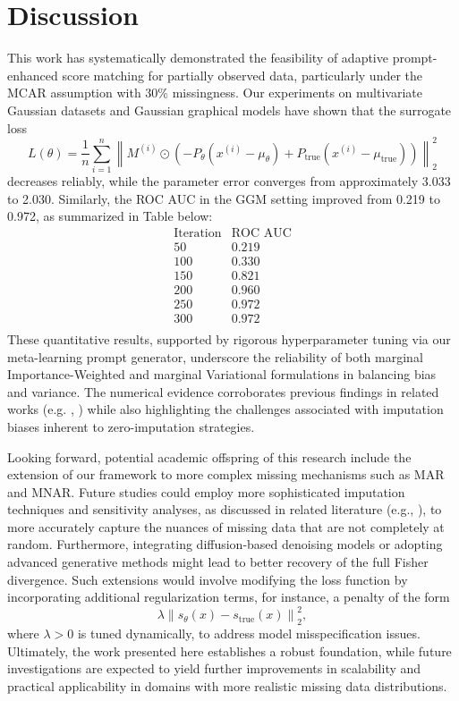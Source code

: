 \documentclass{article} %
\begin{document}
\section{Discussion}
This work has systematically demonstrated the feasibility of adaptive prompt-enhanced score matching for partially observed data, particularly under the MCAR assumption with 30\% missingness. Our experiments on multivariate Gaussian datasets and Gaussian graphical models have shown that the surrogate loss 
\[
L(\theta) = \frac{1}{n} \sum_{i=1}^n \left\| M^{(i)} \odot \left(-P_\theta (x^{(i)} - \mu_\theta) + P_{\mathrm{true}} (x^{(i)} - \mu_{\mathrm{true}})\right) \right\|_2^2
\]
decreases reliably, while the parameter error converges from approximately 3.033 to 2.030. Similarly, the ROC AUC in the GGM setting improved from 0.219 to 0.972, as summarized in Table below:
\[
\begin{array}{c|c}
\text{Iteration} & \text{ROC AUC} \\ \hline
50 & 0.219 \\
100 & 0.330 \\
150 & 0.821 \\
200 & 0.960 \\
250 & 0.972 \\
300 & 0.972 \\
\end{array}
\]
These quantitative results, supported by rigorous hyperparameter tuning via our meta-learning prompt generator, underscore the reliability of both marginal Importance-Weighted and marginal Variational formulations in balancing bias and variance. The numerical evidence corroborates previous findings in related works (e.g. \cite{givens2025score}, \cite{wang2021score} ) while also highlighting the challenges associated with imputation biases inherent to zero-imputation strategies.

Looking forward, potential academic offspring of this research include the extension of our framework to more complex missing mechanisms such as MAR and MNAR. Future studies could employ more sophisticated imputation techniques and sensitivity analyses, as discussed in related literature (e.g., \cite{dioni2025sensitivity}), to more accurately capture the nuances of missing data that are not completely at random. Furthermore, integrating diffusion-based denoising models or adopting advanced generative methods might lead to better recovery of the full Fisher divergence. Such extensions would involve modifying the loss function by incorporating additional regularization terms, for instance, a penalty of the form
\[
\lambda \left\| s_\theta(x) - s_{\mathrm{true}}(x) \right\|_2^2,
\]
where \(\lambda > 0\) is tuned dynamically, to address model misspecification issues. Ultimately, the work presented here establishes a robust foundation, while future investigations are expected to yield further improvements in scalability and practical applicability in domains with more realistic missing data distributions.
\end{document}
